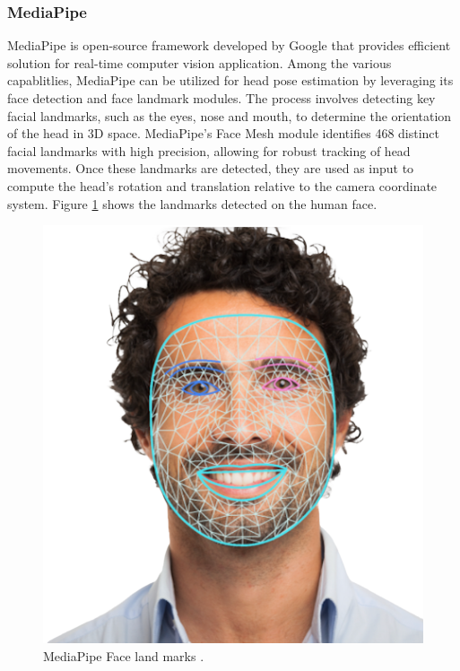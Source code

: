 \documentclass{CSSRforAfrica}
\begin{document}
\subsubsection*{MediaPipe}
MediaPipe is open-source framework developed by Google that provides efficient solution for real-time computer vision application. Among the various capablitlies, MediaPipe can be utilized for head pose estimation by leveraging its face detection and face landmark modules. The process involves detecting key facial landmarks, such as the eyes, nose and mouth, to determine the orientation of the head in 3D space. MediaPipe's Face Mesh module identifies 468 distinct facial landmarks with high precision, allowing for robust tracking of head movements. Once these landmarks are detected, they are used as input to compute the head's rotation and translation relative to the camera coordinate system. Figure \ref{fig: MediaPipe Face land marks} shows the landmarks detected on the human face. 

\newpage

\begin{figure}[!hbpt]
	\centering
	\includegraphics[scale=0.3]{images/MediaPipe_FaceLand_Marks.png}
	\caption{MediaPipe Face land marks \cite{mediapipe_face_landmarker}.}
	\label{fig: MediaPipe Face land marks}
\end{figure}
\end{document}
